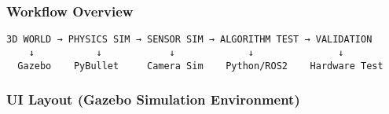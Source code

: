 \documentclass[
]{article}
\begin{document}
\hypertarget{workflow-overview-4}{%
\subsubsection{Workflow Overview}\label{workflow-overview-4}}

\begin{verbatim}
3D WORLD → PHYSICS SIM → SENSOR SIM → ALGORITHM TEST → VALIDATION
    ↓           ↓            ↓             ↓               ↓
  Gazebo    PyBullet     Camera Sim    Python/ROS2    Hardware Test
\end{verbatim}

\hypertarget{ui-layout-gazebo-simulation-environment}{%
\subsubsection{UI Layout (Gazebo Simulation
Environment)}\label{ui-layout-gazebo-simulation-environment}}
\end{document}
